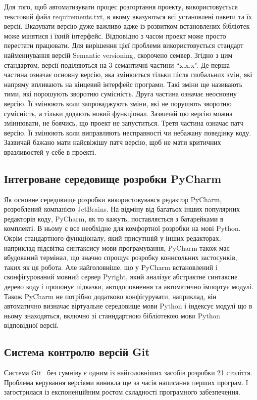 Для того, щоб автоматизувати процес розгортання проекту, використовується
текстовий файл requirements.txt, в якому вказуються всі установлені пакети
та їх версії. Вказувати версію дуже важливо адже із розвитком встановлених
бібліотек може мінятися і їхній інтерфейс. Відповідно з часом проект може
просто перестати працювати. Для вирішення цієї проблеми використовується
стандарт найменнування версій Semantic versioning, скорочено семвер.
Згідно з цим стандартом, версії поділяються на 3 семантичні
частини ``x.x.x''. Де перша частина означає основну версію, яка змінюється
тільки після глобальних змін, які напряму впливають на кінцевий інтерфейс
програми. Такі зміни ще називають тими, які порошують зворотню сумісність.
Друга частина означає неосновну версію. Її змінюють коли запроваджують
зміни, які не порушють зворотню сумісність, а тільки додають новий функціонал.
Зазвичай цю версію можна зміннювати, не боячись, що проект не запуститься.
Третя частина означає патч версію. Її змінюють коли виправляють несправності
чи небажану поведінку коду. Зазвичай бажано мати найсвіжішу патч версію,
щоб не мати критичних вразливостей у себе в проекті.

\subsection{Інтегроване середовище розробки PyCharm}
Як основне середовище розробки використовувався редактор PyCharm, 
розроблений компанією JetBrains. На відміну від багатьох інших
популярних редакторів коду, PyCharm, як то кажуть, поставляється з батарейками
в комплекті. В ньому є все необхідне для комфортної розробки на мові
Python. Окрім стандартного функціоналу, який присутнній у інших
редакторах, наприклад підсвітка синтаксису мови програмування,
PyCharm також має вбудований термінал, що значно спрощує розробку
коннсольних застосунків, таких як ця робота. Але найголовніше,
що у PyCharm встановлений і сконфігурований мовний сервер Pyright,
який аналізує абстрактне синтаксне дерево коду і пропонує підказки,
автодоповнення та автоматично імпортує модулі. Також PyCharm не потрібно
додатково конфігурувати, наприклад, він автоматично визначає віртуальне
середовище мови Python і індексує модулі що в ньому знаходяться,
включно зі станндартною бібліотекою мови Python відповідної версії.

\subsection{Система контролю версій Git}
Система Git~\cite{bib13} без сумніву є одним із найголовніших засобів розробки 21
століття. Проблема
керування версіями виникла ще за часів написання перших програм. І загострилася із
експоненційним ростом складності програмного забезпечення.

